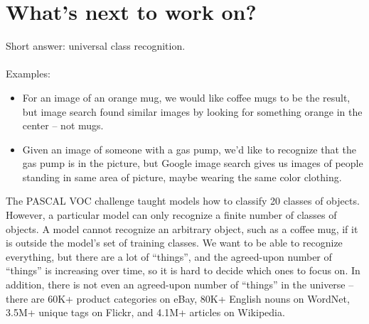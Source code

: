 \documentclass[11pt]{article}
\begin{document}
\section{What's next to work on?}
Short answer: universal class recognition. \\ \\
Examples:
\begin{itemize}
	\item For an image of an orange mug, we would like coffee mugs to be the result, but image search found similar images by looking for something orange in the center – not mugs.
    \item Given an image of someone with a gas pump, we'd like to recognize that the gas pump is in the picture, but Google image search gives us images of people standing in same area of picture, maybe wearing the same color clothing.
    \end{itemize}
The PASCAL VOC challenge taught models how to classify 20 classes of objects.
However, a particular model can only recognize a finite number of classes of objects. A model cannot recognize an arbitrary object, such as a coffee mug, if it is outside the model's set of training classes. We want to be able to recognize everything, but there are a lot of ``things'', and the agreed-upon number of ``things'' is increasing over time, so it is hard to decide which ones to focus on. In addition, there is not even an agreed-upon number of ``things'' in the universe -- there are 60K+ product categories on eBay, 80K+ English nouns on WordNet, 3.5M+ unique tags on Flickr, and 4.1M+ articles on Wikipedia.\\
\end{document}
